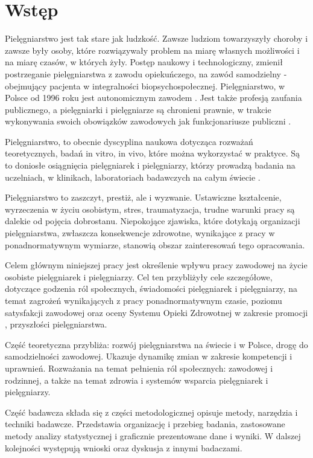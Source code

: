 \documentclass[a4paper,12pt,twoside,openright]{mwrep}
\begin{document}

\chapter*{Wstęp}

Pielęgniarstwo jest tak stare jak ludzkość. Zawsze ludziom towarzyszyły choroby i zawsze były osoby, które rozwiązywały problem na miarę własnych możliwości i na miarę czasów, w których żyły. Postęp naukowy i technologiczny, zmienił postrzeganie pielęgniarstwa z zawodu opiekuńczego, na zawód samodzielny - obejmujący pacjenta w integralności biopsychospołecznej. Pielęgniarstwo, w Polsce od 1996 roku jest autonomicznym zawodem \cite{konst97art17}. Jest także profesją zaufania publicznego, a pielęgniarki i pielęgniarze są chronieni prawnie, w trakcie wykonywania swoich obowiązków zawodowych jak funkcjonariusze publiczni \cite{art4uozp}.

Pielęgniarstwo, to obecnie dyscyplina naukowa dotycząca rozważań teoretycznych, badań in vitro, in vivo, które można wykorzystać w praktyce. Są to doniosłe osiągnięcia pielęgniarek i pielęgniarzy, którzy prowadzą badania na uczelniach, w klinikach, laboratoriach badawczych na całym świecie \cite{nursingresearch}.

Pielęgniarstwo to zaszczyt, prestiż, ale i wyzwanie. Ustawiczne kształcenie, wyrzeczenia w życiu osobistym, stres, traumatyzacja, trudne warunki pracy są dalekie od pojęcia dobrostanu.  Niepokojące zjawiska, które dotykają organizacji pielęgniarstwa, zwłaszcza konsekwencje zdrowotne, wynikające z pracy w ponadnormatywnym wymiarze, stanowią obszar zainteresowań tego opracowania.

Celem głównym niniejszej pracy jest określenie wpływu pracy zawodowej na życie osobiste pielęgniarek i pielęgniarzy. Cel ten przybliżyły cele szczegółowe, dotyczące godzenia ról społecznych, świadomości pielęgniarek i pielęgniarzy, na temat zagrożeń wynikających z pracy ponadnormatywnym czasie, poziomu satysfakcji zawodowej oraz oceny Systemu Opieki Zdrowotnej w zakresie promocji , przyszłości pielęgniarstwa.

Część teoretyczna przybliża: rozwój pielęgniarstwa na świecie i w Polsce, drogę do samodzielności zawodowej. Ukazuje dynamikę zmian w zakresie kompetencji i uprawnień. Rozważania na temat pełnienia ról społecznych: zawodowej i rodzinnej, a także na temat zdrowia i systemów wsparcia pielęgniarek i pielęgniarzy. 

Część badawcza składa się z części metodologicznej opisuje metody, narzędzia i techniki badawcze. Przedstawia organizację i przebieg badania, zastosowane metody analizy statystycznej i graficznie prezentowane dane i wyniki. W dalszej kolejności występują wnioski oraz dyskusja z innymi badaczami.
\end{document}
